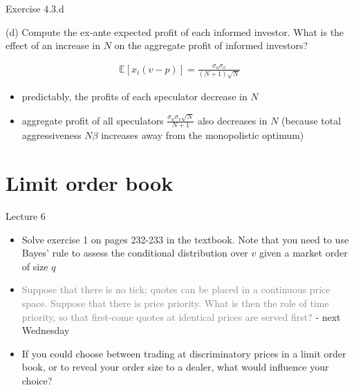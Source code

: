 \documentclass[english,10pt,aspectratio=169]{beamer}
\begin{document}
\begin{frame}{Exercise 4.3.d}
	\begin{exampleblock}{}
		(d) Compute the ex-ante expected profit of each informed investor. What is the effect of an increase in $N$ on the aggregate profit of informed investors?
	\end{exampleblock}

	\pause
	
	\begin{align*}
		\mathbb{E} [x_i(v-p)] = \frac{\sigma_u \sigma_v}{(N+1) \sqrt{N}}
	\end{align*}
	\begin{itemize}
		\item predictably, the profits of each speculator decrease in $N$
		\item aggregate profit of all speculators $\frac{\sigma_u \sigma_v \sqrt{N}}{N+1}$ also decreases in $N$ (because total aggressiveness $N \beta$ increases away from the monopolistic optimum)
	\end{itemize}
\end{frame}




\section{Limit order book}

\begin{frame}{Lecture 6}
	\begin{itemize}
		\item Solve exercise 1 on pages 232-233 in the textbook. Note that you need to use Bayes' rule to assess the conditional distribution over $v$ given a market order of size $q$
		\item \textcolor{gray}{Suppose that there is no tick; quotes can be placed in a continuous price space. Suppose that there is price priority. What is then the role of time priority, so that first-come quotes at identical prices are served first?} - next Wednesday
		\item If you could choose between trading at discriminatory prices in a limit order book, or to reveal your order size to a dealer, what would influence your choice?
	\end{itemize}
\end{frame}
\end{document}
